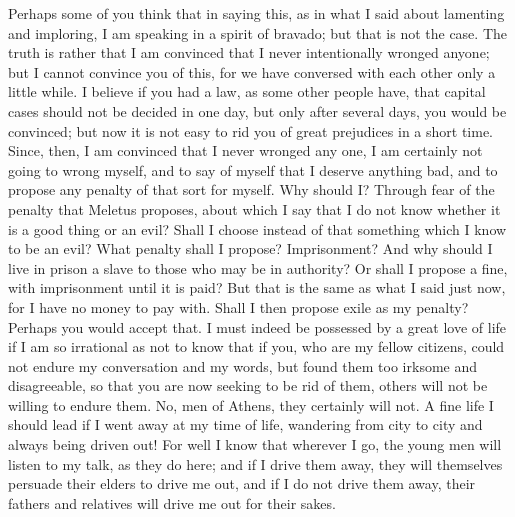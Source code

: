 \documentclass[letterpaper,12pt]{article}
\newcommand{\stephpag}[1]{\marginnote{\small\itshape\fontfamily{ppl}\selectfont #1}}
\begin{document}
Perhaps some of you think that in saying this, as in what I said about lamenting and imploring, I am speaking in a spirit of bravado; but that is not the case. The truth is rather that I am convinced that I never intentionally wronged anyone; but I cannot convince you of this, for we have conversed with each other only a little while. I believe if you had a law, as some other people have, \stephpag{b} that capital cases should not be decided in one day, but only after several days, you would be convinced; but now it is not easy to rid you of great prejudices in a short time. Since, then, I am convinced that I never wronged any one, I am certainly not going to wrong myself, and to say of myself that I deserve anything bad, and to propose any penalty of that sort for myself. Why should I? Through fear of the penalty that Meletus proposes, about which I say that I do not know whether it is a good thing or an evil? Shall I choose instead of that something which I know to be an evil? What penalty shall I propose? Imprisonment? \stephpag{c} And why should I live in prison a slave to those who may be in authority? Or shall I propose a fine, with imprisonment until it is paid? But that is the same as what I said just now, for I have no money to pay with. Shall I then propose exile as my penalty? Perhaps you would accept that. I must indeed be possessed by a great love of life if I am so irrational as not to know that if you, who are my fellow citizens, could not \stephpag{d} endure my conversation and my words, but found them too irksome and disagreeable, so that you are now seeking to be rid of them, others will not be willing to endure them. No, men of Athens, they certainly will not. A fine life I should lead if I went away at my time of life, wandering from city to city and always being driven out! For well I know that wherever I go, the young men will listen to my talk, as they do here; and if I drive them away, they will themselves persuade their elders to drive me out, and if \stephpag{e} I do not drive them away, their fathers and relatives will drive me out for their sakes.
\end{document}
